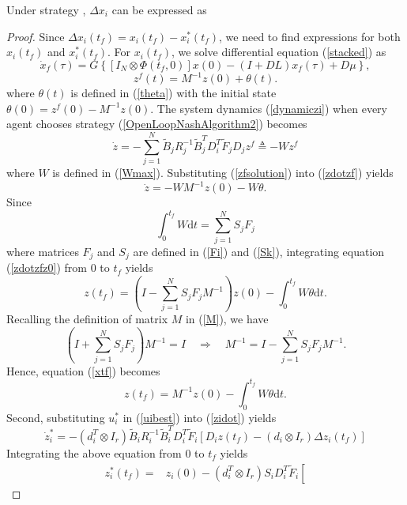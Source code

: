 \documentclass[10pt,doublecolumn]{IEEEtran}  %
\begin{document}
\begin{Lem}
Under strategy , $\Delta x_i$ can be expressed as
\end{Lem}
\begin{proof}
Since $\Delta x_i(t_f)=x_i(t_f)-x_i^*(t_f)$, we need to find expressions for both $x_i(t_f)$ and $x_i^*(t_f)$. For $x_i(t_f)$, we solve differential equation (\ref{stacked}) as
\[\dot{x}_{f}(\tau)=G\left\{[I_N\otimes\Phi(t_f,0)]x(0)-(I+DL)x_f(\tau)+D\mu\right\},\]
\begin{equation}
z^f(t)=M^{-1}z(0)+\theta(t).\label{zfsolution}
\end{equation}
where $\theta(t)$ is defined in (\ref{theta}) with the initial state $\theta(0)=z^f(0)-M^{-1}z(0)$. The system dynamics
(\ref{dynamiczi}) when every agent chooses strategy
(\ref{OpenLoopNashAlgorithm2}) becomes
\begin{equation}
\dot{z}= -\sum^N_{j=1}\tilde{B}_jR^{-1}_j\tilde{B}_j^T
D_i^T\tilde{F}_jD_jz^f\triangleq -Wz^f\label{zdotzf}
\end{equation}
where $W$ is defined in (\ref{Wmax}). Substituting (\ref{zfsolution}) into
(\ref{zdotzf}) yields
\begin{equation}
\dot{z}=-WM^{-1}z(0)-W\theta.  \label{zdotzfz0}
\end{equation}
Since
\[\int^{t_f}_0W\mbox{d}t=\sum^N_{j=1}S_jF_j\]
where matrices $F_j$ and $S_j$ are defined in (\ref{Fi}) and (\ref{Sk}),
integrating equation (\ref{zdotzfz0}) from $0$ to $t_f$ yields
\begin{equation}
z(t_f)=\left(I-\sum^N_{j=1}S_jF_jM^{-1}\right)z(0)
-\int^{t_f}_0W\theta\mbox{d}t. \label{xtf}
\end{equation}
Recalling the definition of matrix $M$ in (\ref{M}), we have
\[\left(I+\sum^N_{j=1}S_jF_j\right)M^{-1} =I\quad\Longrightarrow\quad
M^{-1}=I-\sum^N_{j=1}S_jF_jM^{-1}.\]
Hence, equation (\ref{xtf}) becomes
\begin{equation}
z(t_f)=M^{-1}z(0) -\int^{t_f}_0W\theta\mbox{d}t. \label{xtf1}
\end{equation}
Second, substituting $u^*_i$ in (\ref{uibest}) into (\ref{zidot}) yields
\[\dot{z}^*_i=-(d_i^T\otimes
I_r)\tilde{B}_iR_i^{-1}\tilde{B}_i^TD_i^T\tilde{F}_i \left[
D_iz(t_f)-(d_i\otimes I_r)\Delta z_i(t_f)\right]\]
Integrating the above equation from $0$ to $t_f$ yields
\begin{align*}
z_i^*(t_f)=&z_i(0)-(d_i^T\otimes I_r)S_iD_i^T\tilde{F}_i\left[

\end{align*}
\end{proof}
\end{document}
